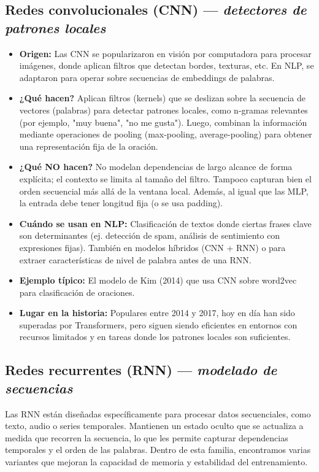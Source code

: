\documentclass[12pt,a4paper,openany,oneside]{book}
\begin{document}
\subsection{Redes convolucionales (CNN) — \textit{detectores de patrones locales}}
\begin{itemize}
\item \textbf{Origen:} Las CNN se popularizaron en visión por computadora para procesar imágenes, donde aplican filtros que detectan bordes, texturas, etc. En NLP, se adaptaron para operar sobre secuencias de embeddings de palabras.
\item \textbf{¿Qué hacen?} Aplican filtros (kernels) que se deslizan sobre la secuencia de vectores (palabras) para detectar patrones locales, como n-gramas relevantes (por ejemplo, "muy buena", "no me gusta"). Luego, combinan la información mediante operaciones de pooling (max-pooling, average-pooling) para obtener una representación fija de la oración.
\item \textbf{¿Qué NO hacen?} No modelan dependencias de largo alcance de forma explícita; el contexto se limita al tamaño del filtro. Tampoco capturan bien el orden secuencial más allá de la ventana local. Además, al igual que las MLP, la entrada debe tener longitud fija (o se usa padding).
\item \textbf{Cuándo se usan en NLP:} Clasificación de textos donde ciertas frases clave son determinantes (ej. detección de spam, análisis de sentimiento con expresiones fijas). También en modelos híbridos (CNN + RNN) o para extraer características de nivel de palabra antes de una RNN.
\item \textbf{Ejemplo típico:} El modelo de Kim (2014) que usa CNN sobre word2vec para clasificación de oraciones.
\item \textbf{Lugar en la historia:} Populares entre 2014 y 2017, hoy en día han sido superadas por Transformers, pero siguen siendo eficientes en entornos con recursos limitados y en tareas donde los patrones locales son suficientes.
\end{itemize}

\subsection{Redes recurrentes (RNN) — \textit{modelado de secuencias}}
Las RNN están diseñadas específicamente para procesar datos secuenciales, como texto, audio o series temporales. Mantienen un estado oculto que se actualiza a medida que recorren la secuencia, lo que les permite capturar dependencias temporales y el orden de las palabras. Dentro de esta familia, encontramos varias variantes que mejoran la capacidad de memoria y estabilidad del entrenamiento.
\end{document}
